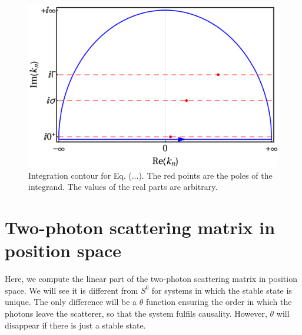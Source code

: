 \documentclass[aps,pra,reprint,amsmath,amssymb]{revtex4-1}
\begin{document}
\begin{figure}
\includegraphics[scale=0.25]{upper_contour.pdf}
\caption{Integration contour for Eq. (...). The red points are the poles of the
integrand. The values of the real parts are arbitrary.}
\end{figure}


\section{Two-photon scattering matrix in position space}

Here, we compute the linear part of the two-photon scattering matrix in position space. We will see it is different from $S^0$ for systems in which the stable state is unique. The only difference will be a $\theta$ function ensuring the order in which the photons leave the scatterer, so that the system fulfils causality. However, $\theta$ will disappear if there is just a stable state. 



\end{document}
